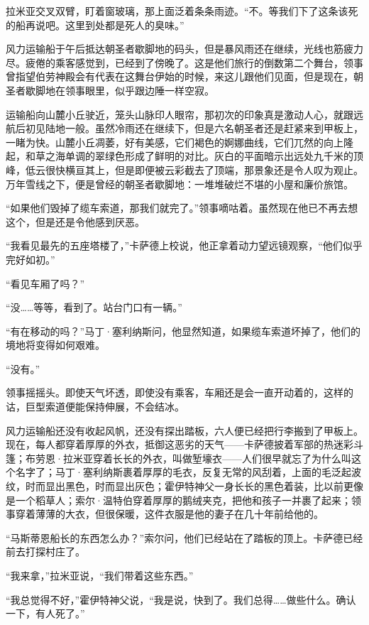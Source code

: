 \documentclass[AutoFakeBold=true]{book}
\begin{document}
拉米亚交叉双臂，盯着窗玻璃，那上面泛着条条雨迹。``不。等我们下了这条该死的船再说吧。这里到处都是死人的臭味。''

\vspace*{1em}

风力运输船于午后抵达朝圣者歇脚地的码头，但是暴风雨还在继续，光线也筋疲力尽。疲倦的乘客感觉到，已经到了傍晚了。这是他们旅行的倒数第二个舞台，领事曾指望伯劳神殿会有代表在这舞台伊始的时候，来这儿跟他们见面，但是现在，朝圣者歇脚地在领事眼里，似乎跟边陲一样空寂。

运输船向山麓小丘驶近，笼头山脉印人眼帘，那初次的印象真是激动人心，就跟远航后初见陆地一般。虽然冷雨还在继续下，但是六名朝圣者还是赶紧来到甲板上，一睹为快。山麓小丘凋萎，好有美感，它们褐色的婀娜曲线，它们兀然的向上隆起，和草之海单调的翠绿色形成了鲜明的对比。灰白的平面暗示出远处九千米的顶峰，低云很快横亘其上，但是即便被云彩截去了顶端，那景象还是令人叹为观止。万年雪线之下，便是曾经的朝圣者歇脚地：一堆堆破烂不堪的小屋和廉价旅馆。

``如果他们毁掉了缆车索道，那我们就完了。''领事嘀咕着。虽然现在他已不再去想这个，但是还是令他感到厌恶。

``我看见最先的五座塔楼了，''卡萨德上校说，他正拿着动力望远镜观察，``他们似乎完好如初。''

``看见车厢了吗？''

``没……等等，看到了。站台门口有一辆。''

``有在移动的吗？''马丁·塞利纳斯问，他显然知道，如果缆车索道坏掉了，他们的境地将变得如何艰难。

``没有。''

领事摇摇头。即使天气坏透，即使没有乘客，车厢还是会一直开动着的，这样的诂，巨型索道便能保持伸展，不会结冰。

风力运输船还没有收起风帆，还没有探出踏板，六人便已经把行李搬到了甲板上。现在，每人都穿着厚厚的外衣，抵御这恶劣的天气——卡萨德披着军部的热迷彩斗篷；布劳恩·拉米亚穿着长长的外衣，叫做堑壕衣——人们很早就忘了为什么叫这个名字了；马丁·塞利纳斯裹着厚厚的毛衣，反复无常的风刮着，上面的毛泛起波纹，时而显出黑色，时而显出灰色；霍伊特神父一身长长的黑色着装，比以前更像是一个稻草人；索尔·温特伯穿着厚厚的鹅绒夹克，把他和孩子一并裹了起来；领事穿着薄薄的大衣，但很保暖，这件衣服是他的妻子在几十年前给他的。

``马斯蒂恩船长的东西怎么办？''索尔问，他们已经站在了踏板的顶上。卡萨德已经前去打探村庄了。

``我来拿，''拉米亚说，``我们带着这些东西。''

``我总觉得不好，''霍伊特神父说，``我是说，快到了。我们总得……做些什么。确认一下，有人死了。''
\end{document}
